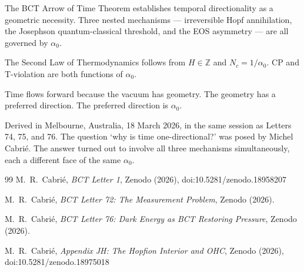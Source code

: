 \documentclass[aps,prl,twocolumn,showpacs,superscriptaddress]{revtex4-2}
\begin{document}
The BCT Arrow of Time Theorem establishes temporal directionality as a 
geometric necessity. Three nested mechanisms --- irreversible Hopf 
annihilation, the Josephson quantum-classical threshold, and the EOS 
asymmetry --- are all governed by $\alpha_0$.

The Second Law of Thermodynamics follows from $H \in \mathbb{Z}$ and 
$N_c = 1/\alpha_0$. CP and T-violation are both functions of $\alpha_0$.

Time flows forward because the vacuum has geometry.
The geometry has a preferred direction.
The preferred direction is $\alpha_0$.

\begin{acknowledgments}
Derived in Melbourne, Australia, 18 March 2026, in the same session as 
Letters 74, 75, and 76. The question `why is time one-directional?' was 
posed by Michel Cabri\'e. The answer turned out to involve all three 
mechanisms simultaneously, each a different face of the same $\alpha_0$.
\end{acknowledgments}

\begin{thebibliography}{99}
 M.~R.~Cabri\'e, \textit{BCT Letter 1}, Zenodo (2026),
doi:10.5281/zenodo.18958207

 M.~R.~Cabri\'e, \textit{BCT Letter 72: The Measurement 
Problem}, Zenodo (2026).

 M.~R.~Cabri\'e, \textit{BCT Letter 76: Dark Energy as BCT 
Restoring Pressure}, Zenodo (2026).

 M.~R.~Cabri\'e, \textit{Appendix JH: The Hopfion Interior 
and OHC}, Zenodo (2026), doi:10.5281/zenodo.18975018
\end{thebibliography}
\end{document}
